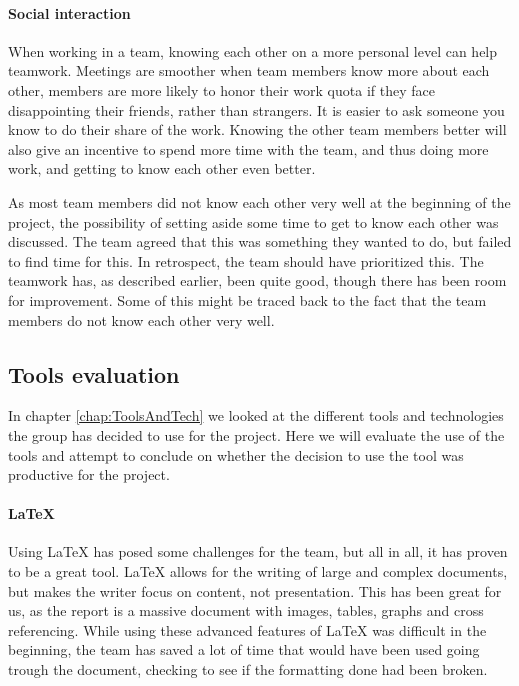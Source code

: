 \documentclass[11pt,a4paper,titlepage,oneside]{report}
\begin{document}
\paragraph{Social interaction}
When working in a team, knowing each other on a more personal level can help teamwork. Meetings are smoother when team members know more about each other, members are more likely to honor their work quota if they face disappointing their friends, rather than strangers. It is easier to ask someone you know to do their share of the work. Knowing the other team members better will also give an incentive to spend more time with the team, and thus doing more work, and getting to know each other even better. \cite{Effective:Teamwork}

As most team members did not know each other very well at the beginning of the project, the possibility of setting aside some time to get to know each other was discussed. The team agreed that this was something they wanted to do, but failed to find time for this. In retrospect, the team should have prioritized this. The teamwork has, as described earlier, been quite good, though there has been room for improvement. Some of this might be traced back to the fact that the team members do not know each other very well.

\subsection{Tools evaluation}
\label{subsec:ToolsEvaluation}
In chapter \ref{chap:ToolsAndTech} we looked at the different tools and technologies the group has decided to use for the project. Here we will evaluate the use of the tools and attempt to conclude on whether the decision to use the tool was productive for the project.

\paragraph{\LaTeX}
Using \LaTeX{} has posed some challenges for the team, but all in all, it has proven to be a great tool. \LaTeX{} allows for the writing of large and complex documents, but makes the writer focus on content, not presentation. This has been great for us, as the report is a massive document with images, tables, graphs and cross referencing. While using these advanced features of \LaTeX{} was difficult in the beginning, the team has saved a lot of time that would have been used going trough the document, checking to see if the formatting done had been broken. 
\end{document}
